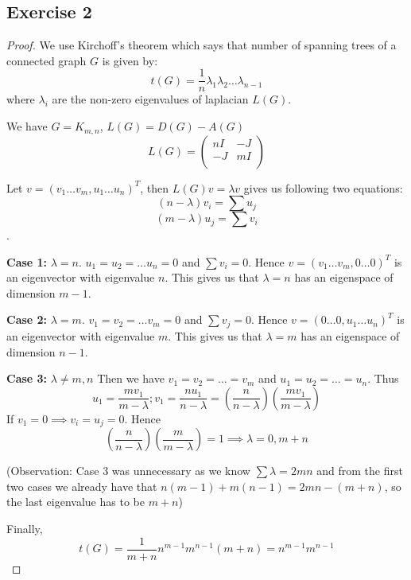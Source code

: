 \documentclass[12pt]{article}
\begin{document}
\subsection*{Exercise 2}
\begin{proof}
We use Kirchoff's theorem which says that number of spanning trees of a connected graph $G$ is given by:
$$t(G) = \frac{1}{n}\lambda_1 \lambda_2 \ldots \lambda_{n-1}$$
where $\lambda_i$ are the non-zero eigenvalues of laplacian $L(G)$.

We have $G = K_{m,n}$, $L(G) = D(G) - A(G)$
$$L(G) = \begin{pmatrix}
nI & -J \\
-J & mI \\
\end{pmatrix}$$

Let $v = (v_1 \ldots v_m, u_1 \ldots u_n)^T$, then $L(G)v = \lambda v$ gives us following two equations:
$$(n-\lambda)v_i = \sum u_j$$
$$(m-\lambda)u_j = \sum v_i$$.

\textbf{Case 1:} $\lambda = n$. $u_1 = u_2 = \ldots u_n = 0$ and $\sum v_i = 0$. Hence $v = (v_1 \ldots v_m, 0 \ldots 0)^T$ is an eigenvector with eigenvalue $n$. This gives us that $\lambda = n$ has an eigenspace of dimension $m-1$.

\textbf{Case 2:} $\lambda = m$. $v_1 = v_2 = \ldots v_m = 0$ and $\sum v_j = 0$. Hence $v = (0 \ldots 0, u_1 \ldots u_n)^T$ is an eigenvector with eigenvalue $m$. This gives us that $\lambda = m$ has an eigenspace of dimension $n-1$.

\textbf{Case 3:} $\lambda \neq m,n$ Then we have $v_1 = v_2 = \ldots = v_m$ and $u_1 = u_2 = \ldots = u_n$. Thus $$u_1 = \frac{mv_1}{m-\lambda}; v_1 = \frac{nu_1}{n-\lambda} = \left(\frac{n}{n-\lambda}\right)\left(\frac{mv_1}{m-\lambda}\right)$$
If $v_1 = 0 \implies v_i = u_j = 0$. Hence $$\left(\frac{n}{n-\lambda}\right)\left(\frac{m}{m-\lambda}\right) = 1 \implies \lambda = 0, m+n$$

(Observation: Case 3 was unnecessary as we know $\sum \lambda = 2mn$ and from the first two cases we already have that $n(m-1) + m(n-1) = 2mn - (m+n)$, so the last eigenvalue has to be $m+n$)

Finally, $$t(G) = \frac{1}{m+n}n^{m-1}m^{n-1}(m+n) = n^{m-1}m^{n-1}$$
\end{proof}



\vspace{2in} %
\end{document}

